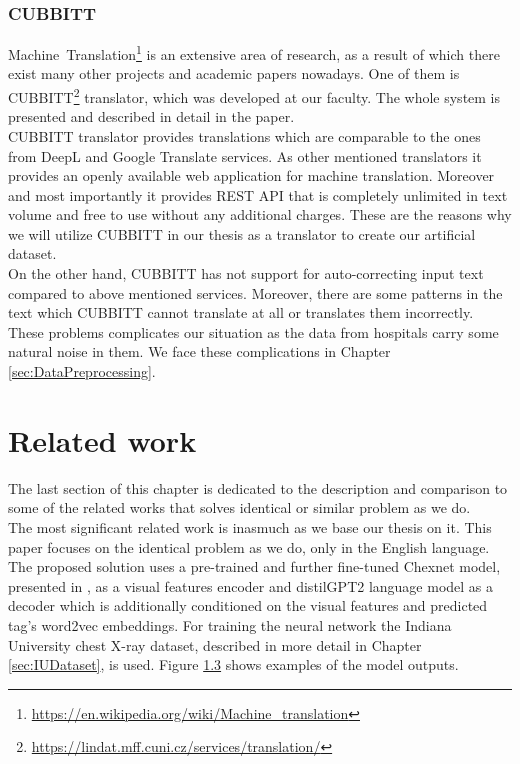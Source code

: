 \subsubsection{CUBBITT}
\label{sec:Cubbitt}
Machine~Translation\footnote[16]{\url{https://en.wikipedia.org/wiki/Machine\_translation}} is an extensive area of research, as a result of which there exist many other projects and academic papers nowadays. One of them is CUBBITT\footnote[17]{\url{https://lindat.mff.cuni.cz/services/translation/}} translator, which was developed at our faculty. The whole system is presented and described in detail in the \citet{biblio:PoToTransformingmachine2020} paper. \\

CUBBITT translator provides translations which are comparable to the ones from DeepL and Google Translate services. As other mentioned translators it provides an openly available web application for machine translation. Moreover and most importantly it provides REST API that is completely unlimited in text volume and free to use without any additional charges. These are the reasons why we will utilize CUBBITT in our thesis as a translator to create our artificial dataset.\\

On the other hand, CUBBITT has not support for auto-correcting input text compared to above mentioned services. Moreover, there are some patterns in the text which CUBBITT cannot translate at all or translates them incorrectly. These problems complicates our situation as the data from hospitals carry some natural noise in them. We face these complications in Chapter \ref{sec:DataPreprocessing}.

\section{Related work}
\label{sec:RelatedWork}
The last section of this chapter is dedicated to the description and comparison to some of the related works that solves identical or similar problem as we do.\\

The most significant related work is \citet{alfarghaly2021automated} inasmuch as we base our thesis on it. This paper focuses on the identical problem as we do, only in the English language. The proposed solution uses a pre-trained and further fine-tuned Chexnet model, presented in \citet{rajpurkar2017chexnet}, as a visual features encoder and distilGPT2 language model\citep{radford2019language} as a decoder which is additionally conditioned on the visual features and predicted tag's word2vec\citep{mikolov2013distributed} embeddings. For training the neural network the Indiana University chest X-ray dataset, described in more detail in Chapter \ref{sec:IUDataset}, is used. Figure \hyperref[fig03:OmarExample]{1.3} shows examples of the model outputs.\\

